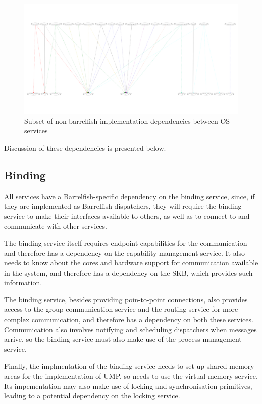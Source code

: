 \documentclass[a4paper,twoside]{report} %
\begin{document}
\begin{figure}[hbt]
 \begin{center}
 \includegraphics[angle=270,scale=0.15]{dep2-i-dot.pdf}
 \end{center}
 \caption{Subset of non-barrelfish implementation dependencies between OS
   services}\label{fig:dep2-i} 
\end{figure}

Discussion of these dependencies is presented below.

\subsection{Binding}

All services have a Barrelfish-specific dependency on the binding
service, since, if they are implemented as Barrelfish dispatchers,
they will require the binding service to make their interfaces
available to others, as well as to connect to and communicate with
other services.

The binding service itself requires endpoint capabilities for the communication
and therefore has a dependency on the capability management service.
It also needs to know about the cores and hardware support for
communication available in the system, and therefore has a dependency
on the SKB, which provides such information.

The binding service, besides providing poin-to-point connections, also
provides access to the group communication service and the routing
service for more complex communication, and therefore has a dependency
on both these services.  Communication also involves notifying and
scheduling dispatchers when messages arrive, so the binding service must
also make use of the process management service.


Finally, the implmentation of the binding service needs to set up
shared memory areas for the implementation of UMP, so needs to use the
virtual memory service.  Its impementation may also make use of
locking and synchronisation primitives, leading to a potential
dependency on the locking service.
\end{document}
